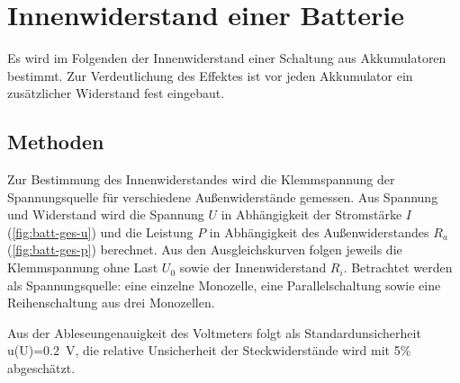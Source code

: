



\section{Innenwiderstand einer Batterie}

Es wird im Folgenden der Innenwiderstand einer Schaltung aus Akkumulatoren bestimmt. Zur Verdeutlichung des Effektes ist vor jeden Akkumulator ein zusätzlicher Widerstand fest eingebaut. 

\subsection{Methoden}


Zur Bestimmung des Innenwiderstandes wird die Klemmspannung der Spannungsquelle für verschiedene Außenwiderstände gemessen. Aus Spannung und Widerstand wird die Spannung $U$ in Abhängigkeit der Stromstärke $I$ (\cref{fig:batt-ges-u}) und die Leistung $P$ in Abhängigkeit des Außenwiderstandes $R_a$ (\cref{fig:batt-ges-p}) berechnet. Aus den Ausgleichskurven folgen jeweils die Klemmspannung ohne Last $U_0$ sowie der Innenwiderstand $R_i$. Betrachtet werden als Spannungsquelle: eine einzelne Monozelle, eine Parallelschaltung sowie eine Reihenschaltung aus drei Monozellen. 

Aus der Ableseungenauigkeit des Voltmeters folgt als Standardunsicherheit u(U)=\SI{0.2}{V}, die relative Unsicherheit der Steckwiderstände wird mit 5\% abgeschätzt.




